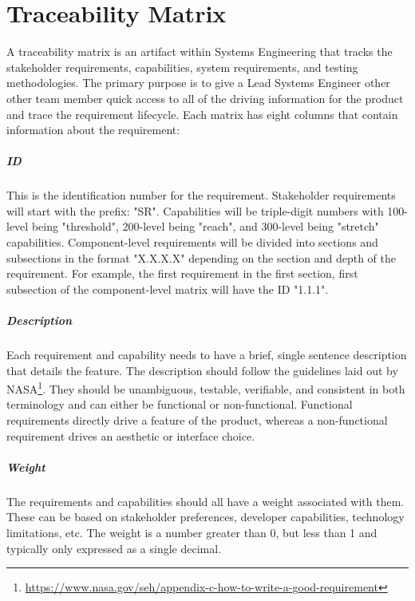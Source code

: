 \chapter{Traceability Matrix} \label{chap:traceability_matrix}
A traceability matrix is an artifact within Systems Engineering that tracks the stakeholder requirements, capabilities, system requirements, and testing methodologies.
The primary purpose is to give a Lead Systems Engineer other other team member quick access to all of the driving information for the product and trace the requirement lifecycle.
Each matrix has eight columns that contain information about the requirement:

\paragraph*{ID} This is the identification number for the requirement.
Stakeholder requirements will start with the prefix: "SR".
Capabilities will be triple-digit numbers with 100-level being "threshold", 200-level being "reach", and 300-level being "stretch" capabilities.
Component-level requirements will be divided into sections and subsections in the format "X.X.X.X" depending on the section and depth of the requirement.
For example, the first requirement in the first section, first subsection of the component-level matrix will have the ID "1.1.1".

\paragraph*{Description} Each requirement and capability needs to have a brief, single sentence description that details the feature.
The description should follow the guidelines laid out by NASA\footnote{\url{https://www.nasa.gov/seh/appendix-c-how-to-write-a-good-requirement}}.
They should be unambiguous, testable, verifiable, and consistent in both terminology and can either be functional or non-functional.
Functional requirements directly drive a feature of the product, whereas a non-functional requirement drives an aesthetic or interface choice.

\paragraph*{Weight} The requirements and capabilities should all have a weight associated with them.
These can be based on stakeholder preferences, developer capabilities, technology limitations, etc.
The weight is a number greater than 0, but less than 1 and typically only expressed as a single decimal.

